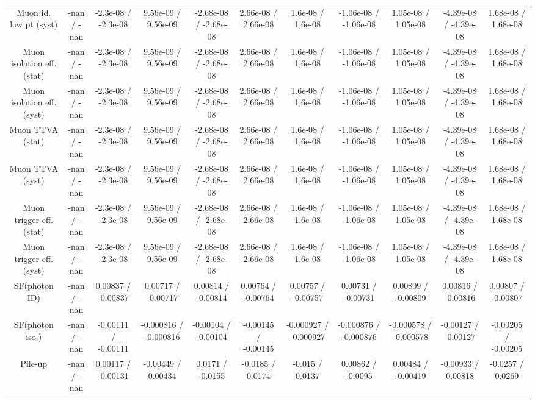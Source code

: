 \begin{table}[htbp]
\begin{center}
\begin{tabular}{|c|c|c|c|c|c|c|c|c|c|c|}
  Muon id. low pt (syst) & -nan / -nan & -2.3e-08 / -2.3e-08 & 9.56e-09 / 9.56e-09 & -2.68e-08 / -2.68e-08 & 2.66e-08 / 2.66e-08 & 1.6e-08 / 1.6e-08 & -1.06e-08 / -1.06e-08 & 1.05e-08 / 1.05e-08 & -4.39e-08 / -4.39e-08 & 1.68e-08 / 1.68e-08 \\ 
  Muon isolation eff. (stat) & -nan / -nan & -2.3e-08 / -2.3e-08 & 9.56e-09 / 9.56e-09 & -2.68e-08 / -2.68e-08 & 2.66e-08 / 2.66e-08 & 1.6e-08 / 1.6e-08 & -1.06e-08 / -1.06e-08 & 1.05e-08 / 1.05e-08 & -4.39e-08 / -4.39e-08 & 1.68e-08 / 1.68e-08 \\ 
  Muon isolation eff. (syst) & -nan / -nan & -2.3e-08 / -2.3e-08 & 9.56e-09 / 9.56e-09 & -2.68e-08 / -2.68e-08 & 2.66e-08 / 2.66e-08 & 1.6e-08 / 1.6e-08 & -1.06e-08 / -1.06e-08 & 1.05e-08 / 1.05e-08 & -4.39e-08 / -4.39e-08 & 1.68e-08 / 1.68e-08 \\ 
  Muon TTVA (stat) & -nan / -nan & -2.3e-08 / -2.3e-08 & 9.56e-09 / 9.56e-09 & -2.68e-08 / -2.68e-08 & 2.66e-08 / 2.66e-08 & 1.6e-08 / 1.6e-08 & -1.06e-08 / -1.06e-08 & 1.05e-08 / 1.05e-08 & -4.39e-08 / -4.39e-08 & 1.68e-08 / 1.68e-08 \\ 
  Muon TTVA (syst) & -nan / -nan & -2.3e-08 / -2.3e-08 & 9.56e-09 / 9.56e-09 & -2.68e-08 / -2.68e-08 & 2.66e-08 / 2.66e-08 & 1.6e-08 / 1.6e-08 & -1.06e-08 / -1.06e-08 & 1.05e-08 / 1.05e-08 & -4.39e-08 / -4.39e-08 & 1.68e-08 / 1.68e-08 \\ 
  Muon trigger eff. (stat) & -nan / -nan & -2.3e-08 / -2.3e-08 & 9.56e-09 / 9.56e-09 & -2.68e-08 / -2.68e-08 & 2.66e-08 / 2.66e-08 & 1.6e-08 / 1.6e-08 & -1.06e-08 / -1.06e-08 & 1.05e-08 / 1.05e-08 & -4.39e-08 / -4.39e-08 & 1.68e-08 / 1.68e-08 \\ 
  Muon trigger eff. (syst) & -nan / -nan & -2.3e-08 / -2.3e-08 & 9.56e-09 / 9.56e-09 & -2.68e-08 / -2.68e-08 & 2.66e-08 / 2.66e-08 & 1.6e-08 / 1.6e-08 & -1.06e-08 / -1.06e-08 & 1.05e-08 / 1.05e-08 & -4.39e-08 / -4.39e-08 & 1.68e-08 / 1.68e-08 \\ 
  SF(photon ID) & -nan / -nan & 0.00837 / -0.00837 & 0.00717 / -0.00717 & 0.00814 / -0.00814 & 0.00764 / -0.00764 & 0.00757 / -0.00757 & 0.00731 / -0.00731 & 0.00809 / -0.00809 & 0.00816 / -0.00816 & 0.00807 / -0.00807 \\ 
  SF(photon iso.) & -nan / -nan & -0.00111 / -0.00111 & -0.000816 / -0.000816 & -0.00104 / -0.00104 & -0.00145 / -0.00145 & -0.000927 / -0.000927 & -0.000876 / -0.000876 & -0.000578 / -0.000578 & -0.00127 / -0.00127 & -0.00205 / -0.00205 \\ 
  Pile-up & -nan / -nan & 0.00117 / -0.00131 & -0.00449 / 0.00434 & 0.0171 / -0.0155 & -0.0185 / 0.0174 & -0.015 / 0.0137 & 0.00862 / -0.0095 & 0.00484 / -0.00419 & -0.00933 / 0.00818 & -0.0257 / 0.0269 \\ 

\end{tabular}
\end{center}
\end{table}
